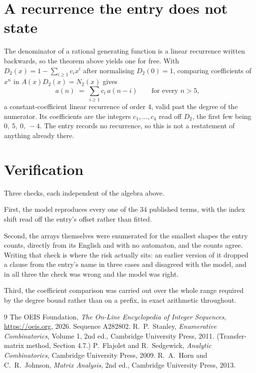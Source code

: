 \documentclass[11pt,a4paper]{article}
\theoremstyle{plain}
\theoremstyle{definition}
\begin{document}
\section{A recurrence the entry does not state}

The denominator of a rational generating function is a linear recurrence written backwards, so
the theorem above yields one for free. With $D_2(x)=1-\sum_{i\ge1}c_ix^i$ after normalising
$D_2(0)=1$, comparing coefficients of $x^n$ in $A(x)D_2(x)=N_2(x)$ gives
\[
a(n)\;=\;\sum_{i\ge1}c_i\,a(n-i)\qquad\text{for every }n>5,
\]
a constant-coefficient linear recurrence of order $4$, valid past the degree of the
numerator. Its coefficients are the integers $c_1,\dots,c_{4}$ read off $D_2$, the first few being $0,\ 5,\ 0,\ -4$. The entry records no recurrence, so this is not a restatement of anything
already there.

\section{Verification}

Three checks, each independent of the algebra above.

First, the model reproduces every one of the $34$ published terms, with the index shift
read off the entry's offset rather than fitted.

Second, the arrays themselves were enumerated for the smallest shapes the entry counts,
directly from its English and with no automaton, and the counts agree. Writing that check is
where the risk actually sits: an earlier version of it dropped a clause from the entry's name
in three cases and disagreed with the model, and in all three the check was wrong and the model
was right.

Third, the coefficient comparison was carried out over the whole range required by the degree
bound rather than on a prefix, in exact arithmetic throughout.

\begin{thebibliography}{9}
 The OEIS Foundation, \emph{The On-Line Encyclopedia of Integer
Sequences}, \url{https://oeis.org}, 2026. Sequence A282802.
 R.~P.~Stanley, \emph{Enumerative Combinatorics}, Volume 1, 2nd ed.,
Cambridge University Press, 2011. (Transfer-matrix method, Section 4.7.)
 P.~Flajolet and R.~Sedgewick, \emph{Analytic Combinatorics}, Cambridge
University Press, 2009.
 R.~A.~Horn and C.~R.~Johnson, \emph{Matrix Analysis}, 2nd ed., Cambridge
University Press, 2013.
\end{thebibliography}
\end{document}
